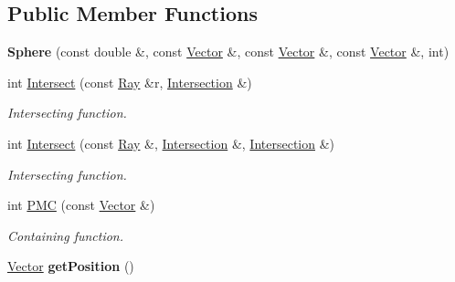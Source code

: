 \subsection*{\-Public \-Member \-Functions}
\begin{DoxyCompactItemize}
\item 
\hypertarget{class_sphere_ae1b26180ec6543e7705c69dc680a54b5}{
{\bfseries \-Sphere} (const double \&, const \hyperlink{class_vector}{\-Vector} \&, const \hyperlink{class_vector}{\-Vector} \&, const \hyperlink{class_vector}{\-Vector} \&, int)}
\label{class_sphere_ae1b26180ec6543e7705c69dc680a54b5}

\item 
int \hyperlink{class_sphere_a4d1505b571540d40c3a6a60bd06e5fe8}{\-Intersect} (const \hyperlink{class_ray}{\-Ray} \&r, \hyperlink{class_intersection}{\-Intersection} \&)
\begin{DoxyCompactList}\small\item\em \-Intersecting function. \end{DoxyCompactList}\item 
int \hyperlink{class_sphere_a4199ccb2215a5c4ba1d2e80ffc842592}{\-Intersect} (const \hyperlink{class_ray}{\-Ray} \&, \hyperlink{class_intersection}{\-Intersection} \&, \hyperlink{class_intersection}{\-Intersection} \&)
\begin{DoxyCompactList}\small\item\em \-Intersecting function. \end{DoxyCompactList}\item 
int \hyperlink{class_sphere_abccfe78233b90c14e6e2afe74e27e6d5}{\-P\-M\-C} (const \hyperlink{class_vector}{\-Vector} \&)
\begin{DoxyCompactList}\small\item\em \-Containing function. \end{DoxyCompactList}\item 
\hypertarget{class_sphere_af1989cb4d1c48de8e2f90c7e9ef21db8}{
\hyperlink{class_vector}{\-Vector} {\bfseries get\-Position} ()}
\label{class_sphere_af1989cb4d1c48de8e2f90c7e9ef21db8}

\end{DoxyCompactItemize}
